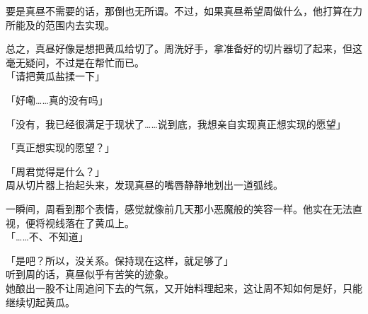 要是真昼不需要的话，那倒也无所谓。不过，如果真昼希望周做什么，他打算在力所能及的范围内去实现。

总之，真昼好像是想把黄瓜给切了。周洗好手，拿准备好的切片器切了起来，但这毫无疑问，不过是在帮忙而已。\\

「请把黄瓜盐揉一下」

「好嘞……真的没有吗」

「没有，我已经很满足于现状了……说到底，我想亲自实现真正想实现的愿望」

「真正想实现的愿望？」

「周君觉得是什么？」\\

周从切片器上抬起头来，发现真昼的嘴唇静静地划出一道弧线。

一瞬间，周看到那个表情，感觉就像前几天那小恶魔般的笑容一样。他实在无法直视，便将视线落在了黄瓜上。\\

「……不、不知道」

「是吧？所以，没关系。保持现在这样，就足够了」\\

听到周的话，真昼似乎有苦笑的迹象。\\

她酿出一股不让周追问下去的气氛，又开始料理起来，这让周不知如何是好，只能继续切起黄瓜。
